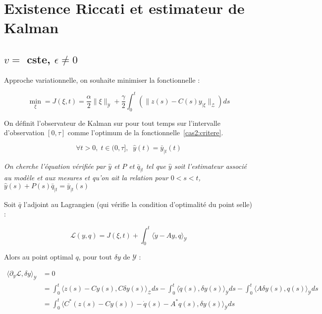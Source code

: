\documentclass[a4paper]{article}
\begin{document}
\section{Existence Riccati et estimateur de Kalman}


\subsection{$v =$ cste, $\epsilon \ne 0$}

Approche variationnelle, on souhaite minimiser la fonctionnelle :

\begin{equation}
	\label{cas2:critere}
	\displaystyle
	\min_{\xi} = J(\xi,t) = \frac{\alpha}{2}\|\xi \|_{\mathscr{Y}} 
	                      + \frac{\gamma}{2}\int_0^t (\|z(s)-C(s)y_{| \xi}\|_{\mathscr{Z}})ds
\end{equation}


On définit l'observateur de Kalman sur pour tout temps sur l'intervalle 
d'observation $[0,\tau]$ comme l'optimum de la fonctionnelle~\eqref{cas2:critere}.

\[ \forall t>0, \; t\in (0,\tau], \; \; \hat{y}(t) = \bar{y}_{|t}(t) \]

\textit{On cherche l'équation vérifiée par $\hat{y}$ 
et $P$ et $\bar{q}_{|t}$ tel que 
$\hat{y}$ soit l'estimateur associé au modèle et aux mesures
et qu'on ait la relation pour $0<s<t$, 
$\hat{y}(s)+ P(s)\bar{q}_{|t} = \bar{y}_{|t}(s)$}

\vspace{0.3cm}
Soit $\bar{q}$ l'adjoint au Lagrangien (qui vérifie la condition d'optimalité du point selle) :

\[ 
\mathscr{L}(y,q)= J(\xi,t)+\int_0^t \langle \dot{y}-Ay, q \rangle_{\mathscr{Y}}
\]

Alors au point optimal $q$, pour tout $\delta y$ de $\mathscr{Y}$ :

\[
\begin{split}
\langle \partial_y \mathscr{L}, \delta y \rangle_{\mathscr{Y}} & =0 \\ 
          &= \int_0^t \langle z(s) - Cy(s), C \delta y(s) \rangle_{\mathscr{Z}}ds
		   - \int_0^t \langle \dot{q}(s), \delta y(s) \rangle_{\mathscr{Y}}ds
		   - \int_0^t \langle A \delta y(s), q(s) \rangle_{\mathscr{Y}} ds\\
		  & = \int_0^t \langle C^* (z(s) - Cy(s))
		   - \dot{q}(s)
		   -A^* q(s)
		   , \delta y(s) \rangle_{\mathscr{Y}} ds
\end{split}
\]
\end{document}
